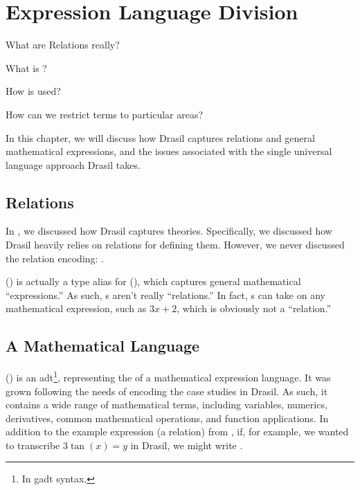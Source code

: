 \chapter{Expression Language Division}
\label{chap:lang-division}

\begin{writingdirectives}
    \item What are Relations really?
    \item What is \Expr{}?
    \item How is \Expr{} used?
    \item How can we restrict \Expr{} terms to particular areas?
\end{writingdirectives}

In this chapter, we will discuss how Drasil captures relations and general
mathematical expressions, and the issues associated with the single universal
language approach Drasil takes.

\section{Relations}
\label{chap:lang-division:sec:relations}

In , we discussed how Drasil captures theories.
Specifically, we discussed how Drasil heavily relies on relations for defining
them. However, we never discussed the relation encoding: \Relation{}.

\originalRelation{}

\Relation{} () is actually a type alias for \Expr{}
(), which captures general mathematical
``expressions.'' As such, \Relation{}s aren't really ``relations.'' In fact,
\Relation{}s can take on any mathematical expression, such as \(3x+2\), which is
obviously not a ``relation.''

\originalExprHaskell{}

\section{A Mathematical Language}
\label{chap:lang-division:sec:a-mathematical-language}

\Expr{} () is an \acs{adt}\footnote{In \acs{gadt}
syntax.}, representing the  of a mathematical expression language. It
was grown following the needs of encoding the case studies in Drasil. As such,
it contains a wide range of mathematical terms, including variables, numerics,
derivatives, common mathematical operations, and function applications. In
addition to the example expression (a relation) from
, if, for example, we wanted to transcribe
\(3 \tan{}(x) = y\) in Drasil, we might write .

